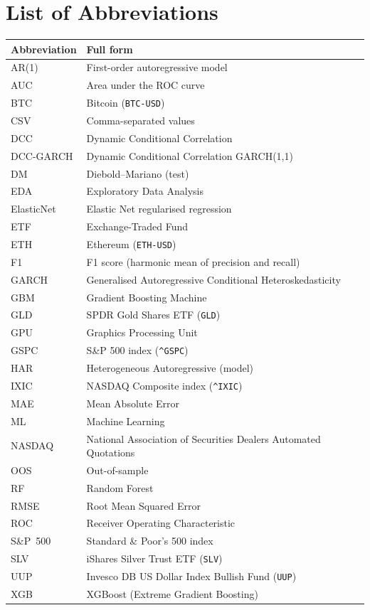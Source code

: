\section*{List of Abbreviations}

\begin{tabular}{@{}p{3cm}p{11cm}@{}}
    \toprule
    \textbf{Abbreviation} & \textbf{Full form} \\
    \midrule
    AR(1)        & First-order autoregressive model \\
    AUC        & Area under the ROC curve \\
    BTC        & Bitcoin (\texttt{BTC-USD}) \\
    CSV        & Comma-separated values \\
    DCC        & Dynamic Conditional Correlation \\
    DCC-GARCH  & Dynamic Conditional Correlation GARCH(1,1) \\
    DM         & Diebold--Mariano (test) \\
    EDA        & Exploratory Data Analysis \\
    ElasticNet & Elastic Net regularised regression \\
    ETF        & Exchange-Traded Fund \\
    ETH        & Ethereum (\texttt{ETH-USD}) \\
    F1         & F1 score (harmonic mean of precision and recall) \\
    GARCH      & Generalised Autoregressive Conditional Heteroskedasticity \\
    GBM        & Gradient Boosting Machine \\
    GLD        & SPDR Gold Shares ETF (\texttt{GLD}) \\
    GPU        & Graphics Processing Unit \\
    GSPC       & S\&P 500 index (\texttt{\^{}GSPC}) \\
    HAR        & Heterogeneous Autoregressive (model) \\
    IXIC       & NASDAQ Composite index (\texttt{\^{}IXIC}) \\
    MAE        & Mean Absolute Error \\
    ML         & Machine Learning \\
    NASDAQ     & National Association of Securities Dealers Automated Quotations \\
    OOS        & Out-of-sample \\
    RF         & Random Forest \\
    RMSE       & Root Mean Squared Error \\
    ROC        & Receiver Operating Characteristic \\
    S\&P~500   & Standard \& Poor's 500 index \\
    SLV        & iShares Silver Trust ETF (\texttt{SLV}) \\
    UUP        & Invesco DB US Dollar Index Bullish Fund (\texttt{UUP}) \\
    XGB        & XGBoost (Extreme Gradient Boosting) \\
    \bottomrule
\end{tabular}

\newpage
